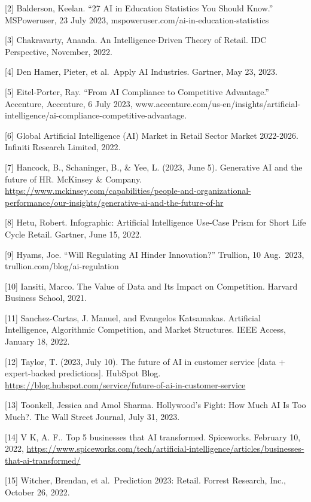 \documentclass[
]{book}
\begin{document}
{[}2{]} Balderson, Keelan. ``27 AI in Education Statistics You Should Know.'' MSPoweruser, 23 July 2023, mspoweruser.com/ai-in-education-statistics

{[}3{]} Chakravarty, Ananda. An Intelligence-Driven Theory of Retail. IDC Perspective, November, 2022.

{[}4{]} Den Hamer, Pieter, et al.~Apply AI Industries. Gartner, May 23, 2023.

{[}5{]} Eitel-Porter, Ray. ``From AI Compliance to Competitive Advantage.'' Accenture, Accenture, 6 July 2023, www.accenture.com/us-en/insights/artificial-intelligence/ai-compliance-competitive-advantage.

{[}6{]} Global Artificial Intelligence (AI) Market in Retail Sector Market 2022-2026. Infiniti Research Limited, 2022.

{[}7{]} Hancock, B., Schaninger, B., \& Yee, L. (2023, June 5). Generative AI and the future of HR. McKinsey \& Company. \url{https://www.mckinsey.com/capabilities/people-and-organizational-performance/our-insights/generative-ai-and-the-future-of-hr}

{[}8{]} Hetu, Robert. Infographic: Artificial Intelligence Use-Case Prism for Short Life Cycle Retail. Gartner, June 15, 2022.

{[}9{]} Hyams, Joe. ``Will Regulating AI Hinder Innovation?'' Trullion, 10 Aug.~2023, trullion.com/blog/ai-regulation

{[}10{]} Iansiti, Marco. The Value of Data and Its Impact on Competition. Harvard Business School, 2021.

{[}11{]} Sanchez-Cartas, J. Manuel, and Evangelos Katsamakas. Artificial Intelligence, Algorithmic Competition, and Market Structures. IEEE Access, January 18, 2022.

{[}12{]} Taylor, T. (2023, July 10). The future of AI in customer service {[}data + expert-backed predictions{]}. HubSpot Blog. \url{https://blog.hubspot.com/service/future-of-ai-in-customer-service}

{[}13{]} Toonkell, Jessica and Amol Sharma. Hollywood's Fight: How Much AI Is Too Much?. The Wall Street Journal, July 31, 2023.

{[}14{]} V K, A. F.. Top 5 businesses that AI transformed. Spiceworks. February 10, 2022, \url{https://www.spiceworks.com/tech/artificial-intelligence/articles/businesses-that-ai-transformed/}

{[}15{]} Witcher, Brendan, et al.~Prediction 2023: Retail. Forrest Research, Inc., October 26, 2022.
\end{document}

